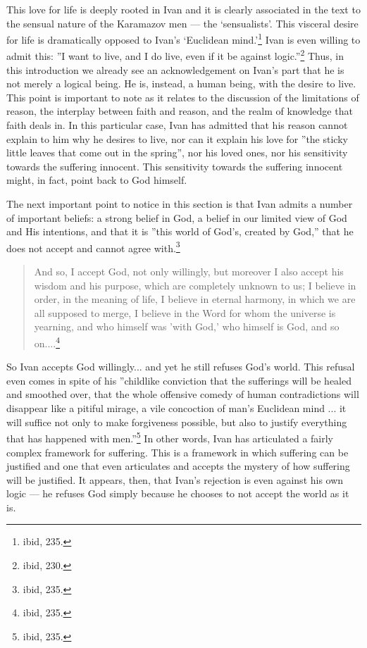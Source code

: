 This love for life is deeply rooted in Ivan and it is clearly associated in the text to the sensual nature of the Karamazov men --- the `sensualists'. This visceral desire for life is dramatically opposed to Ivan's `Euclidean mind.'\footnote{ibid, 235.} Ivan is even willing to admit this: ''I want to live, and I do live, even if it be against logic.''\footnote{ibid, 230.} Thus, in this introduction we already see an acknowledgement on Ivan's part that he is not merely a logical being. He is, instead, a human being, with the desire to live. This point is important to note as it relates to the discussion of the limitations of reason, the interplay between faith and reason, and the realm of knowledge that faith deals in. In this particular case, Ivan has admitted that his reason cannot explain to him why he desires to live, nor can it explain his love for ''the sticky little leaves that come out in the spring'', nor his loved ones, nor his sensitivity towards the suffering innocent. This sensitivity towards the suffering innocent might, in fact, point back to God himself.

The next important point to notice in this section is that Ivan admits a number of important beliefs: a strong belief in God, a belief in our limited view of God and His intentions, and that it is ''this world of God's, created by God,'' that he does not accept and cannot agree with.\footnote{ibid, 235.}

\begin{quote}
And so, I accept God, not only willingly, but moreover I also accept his wisdom and his purpose, which are completely unknown to us; I believe in order, in the meaning of life, I believe in eternal harmony, in which we are all supposed to merge, I believe in the Word for whom the universe is yearning, and who himself was 'with God,' who himself is God, and so on....\footnote{ibid, 235.}
\end{quote} 

So Ivan accepts God willingly... and yet he still refuses God's world. This refusal even comes in spite of his ''childlike conviction that the sufferings will be healed and smoothed over, that the whole offensive comedy of human contradictions will disappear like a pitiful mirage, a vile concoction of man's Euclidean mind ... it will suffice not only to make forgiveness possible, but also to justify everything that has happened with men.''\footnote{ibid, 235.} In other words, Ivan has articulated a fairly complex framework for suffering. This is a framework in which suffering can be justified and one that even articulates and accepts the mystery of how suffering will be justified. It appears, then, that Ivan's rejection is even against his own logic --- he refuses God simply because he chooses to not accept the world as it is.

